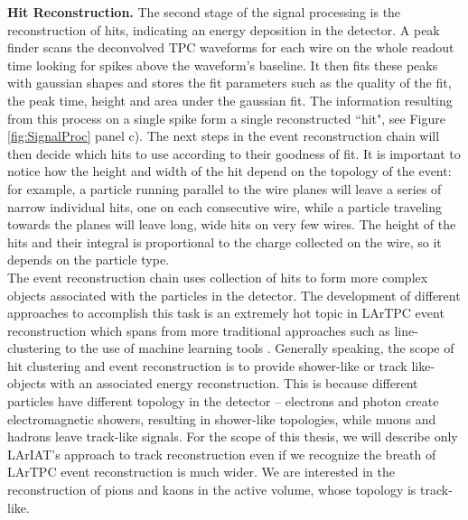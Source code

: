 \textbf{Hit Reconstruction.} The second stage of the signal processing is the reconstruction of hits, indicating an energy deposition in the detector.  A peak finder scans the deconvolved TPC waveforms for each wire on the whole readout time looking for spikes  above  the waveform's baseline. It then fits these peaks with gaussian shapes and stores the fit parameters such as the quality of the fit, the peak time, height and area under the gaussian fit. The information resulting from this process on a single spike form a single reconstructed ``hit", see Figure \ref{fig:SignalProc} panel c).
The next steps in the event reconstruction chain will then decide which hits to use according to their goodness of fit. It is important to notice how the height and width of the hit depend on the topology of the event: for example, a particle running  parallel to the wire planes will leave a series of narrow individual hits, one on each consecutive wire, while a particle traveling towards the planes will leave long, wide hits on very few wires. The height of the hits and their integral is proportional to the charge collected on the wire, so it depends on the particle type.\\

The event reconstruction chain uses collection of hits to form more complex objects associated with the particles in the detector. The development of different approaches to accomplish this task is an extremely hot topic in LArTPC event reconstruction which spans from more traditional approaches such as line-clustering  \cite{Barker2011} to the use of machine learning tools \cite{1748-0221-12-03-P03011}. Generally speaking, the scope of hit clustering and event reconstruction is to provide shower-like or track like-objects with an associated energy reconstruction. This is because different particles have different topology in the detector -- electrons and photon create electromagnetic showers,  resulting in shower-like topologies, while muons and hadrons  leave track-like signals.  For the scope of this thesis, we will describe only LArIAT's approach to track reconstruction even if we recognize the breath of LArTPC event reconstruction is much wider. We are interested in the reconstruction of pions and kaons in the active volume, whose topology is track-like.\\

